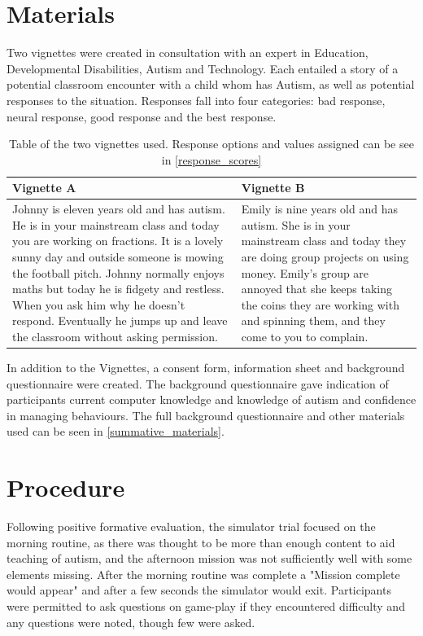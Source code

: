 \documentclass[11pt]{report}
\begin{document}
\section{Materials}
Two vignettes were created in consultation with an expert in Education, Developmental Disabilities, Autism and Technology. Each entailed a story of a potential classroom encounter with a child whom has Autism, as well as potential responses to the situation. Responses fall into four categories: bad response,  neural response, good response and the best response.

\begin{table}[H]
    \begin{tabular}{| p{8cm} | p{8cm} |}
    \hline
    \textbf{Vignette A} & \textbf{Vignette B}                                                                                                                                                                             \\    
    \hline
    \hline
    Johnny is eleven years old and has autism. He is in your mainstream class and today you are working on fractions. It is a lovely sunny day and outside someone is mowing the football pitch.  Johnny normally enjoys maths but today he is fidgety and restless.  When you ask him why he doesn't respond.  Eventually he jumps up and leave the classroom without asking permission. & 
	Emily is nine years old and has autism. She is in your mainstream class and today they are doing group projects on using money. Emily's group are annoyed that she keeps taking the coins they are working with and spinning them, and they come to you to complain.\\ 
    \hline
    \end{tabular}
    \caption{Table of the two vignettes used. Response options and values assigned can be see in \ref{response_scores}}
\end{table}

In addition to the Vignettes, a consent form, information sheet and background questionnaire were created. The background questionnaire gave indication of participants current computer knowledge and knowledge of autism and confidence in managing behaviours. The full background questionnaire and other materials used can be seen in \ref{summative_materials}.

\section{Procedure}
Following positive formative evaluation, the simulator trial focused on the morning routine, as there was thought to be more than enough content to aid teaching of autism, and the afternoon mission was not sufficiently well with some elements missing. After the morning routine was complete a "Mission complete would appear" and after a few seconds the simulator would exit.  Participants were permitted to ask questions on game-play if they encountered difficulty and any questions were noted, though few were asked.
\end{document}
